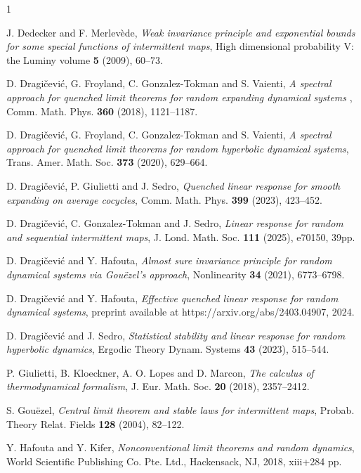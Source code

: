 \documentclass[12pt,reqno,a4paper]{article}
\begin{document}
\begin{thebibliography}{1}
	
	 J. Dedecker and F. Merlev\`{e}de, \emph{Weak invariance principle and exponential bounds for some special functions of intermittent maps}, High dimensional probability V: the Luminy volume \textbf{5} (2009), 60--73.
	
	D. Dragi\v cevi\' c, G. Froyland, C. Gonzalez-Tokman and S. Vaienti, \emph{A spectral approach for quenched limit theorems for random expanding dynamical systems
	}, Comm. Math. Phys. \textbf{360} (2018), 1121--1187.
	
	D. Dragi\v cevi\' c, G. Froyland, C. Gonzalez-Tokman and S. Vaienti, \emph{A spectral approach for quenched limit theorems for random hyperbolic dynamical systems}, Trans. Amer. Math. Soc. \textbf{373} (2020), 629--664.
	
	D. Dragi\v cevi\' c, P. Giulietti and J. Sedro, \emph{Quenched linear response for smooth expanding on average cocycles}, Comm. Math. Phys. \textbf{399} (2023),  423--452.
	
	
	 D. Dragi\v cevi\' c, C. Gonzalez-Tokman and J. Sedro, \emph{Linear response for random and sequential intermittent maps}, J. Lond. Math. Soc. \textbf{111} (2025), e70150, 39pp.
	
	D. Dragi\v cevi\' c and Y. Hafouta, \emph{Almost sure invariance principle for random dynamical systems via Gou\"{e}zel's approach}, 
	Nonlinearity \textbf{34} (2021), 6773--6798.
	
	D. Dragi\v cevi\' c and Y. Hafouta, \emph{Effective quenched linear response for random dynamical systems}, preprint available 
	at https://arxiv.org/abs/2403.04907, 2024.
	
	D. Dragi\v cevi\' c and J. Sedro, \emph{Statistical stability and linear response for random hyperbolic dynamics}, Ergodic Theory Dynam. Systems \textbf{43} (2023),  515--544.
	
	P. Giulietti, B. Kloeckner, A. O. Lopes and D. Marcon, \emph{The calculus of thermodynamical
		formalism}, J. Eur. Math. Soc. \textbf{20} (2018), 2357--2412.
	
	 S. Gou{\"e}zel, \emph{Central limit theorem and stable laws for intermittent maps}, Probab. Theory Relat. Fields \textbf{128} (2004), 82--122.
	
	Y. Hafouta and Y. Kifer, \emph{Nonconventional limit theorems and random dynamics}, World Scientific Publishing Co. Pte. Ltd., Hackensack, NJ, 2018, xiii+284 pp.
	

\end{thebibliography}
\end{document}
